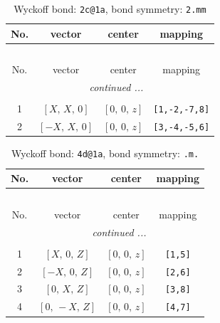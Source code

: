 \documentclass[fleqn,8pt]{jsarticle}
\begin{document}
\renewcommand{\arraystretch}{1.2}
\begin{longtable}{cccc}
\caption{Wyckoff bond: {\tt 2c@1a}, bond symmetry: {\tt 2.mm}}
 \\
 \hline \hline
No. & vector & center & mapping \\ \hline \endfirsthead

\multicolumn{3}{l}{\tablename\ \thetable{}} \\
 \hline \hline
No. & vector & center & mapping \\ \hline \endhead

 \hline \hline
\multicolumn{3}{r}{\footnotesize\it continued ...} \\ \endfoot

 \hline \hline
\multicolumn{3}{r}{} \\ \endlastfoot

1 & $\left[ X,\, X,\, 0 \right]$ & $\left[ 0,\, 0,\, z \right]$ & {\tt [1,-2,-7,8]} \\ \hline
2 & $\left[ - X,\, X,\, 0 \right]$ & $\left[ 0,\, 0,\, z \right]$ & {\tt [3,-4,-5,6]} \\
\end{longtable}
\renewcommand{\arraystretch}{1.2}
\begin{longtable}{cccc}
\caption{Wyckoff bond: {\tt 4d@1a}, bond symmetry: {\tt .m.}}
 \\
 \hline \hline
No. & vector & center & mapping \\ \hline \endfirsthead

\multicolumn{3}{l}{\tablename\ \thetable{}} \\
 \hline \hline
No. & vector & center & mapping \\ \hline \endhead

 \hline \hline
\multicolumn{3}{r}{\footnotesize\it continued ...} \\ \endfoot

 \hline \hline
\multicolumn{3}{r}{} \\ \endlastfoot

1 & $\left[ X,\, 0,\, Z \right]$ & $\left[ 0,\, 0,\, z \right]$ & {\tt [1,5]} \\ \hline
2 & $\left[ - X,\, 0,\, Z \right]$ & $\left[ 0,\, 0,\, z \right]$ & {\tt [2,6]} \\ \hline
3 & $\left[ 0,\, X,\, Z \right]$ & $\left[ 0,\, 0,\, z \right]$ & {\tt [3,8]} \\ \hline
4 & $\left[ 0,\, - X,\, Z \right]$ & $\left[ 0,\, 0,\, z \right]$ & {\tt [4,7]} \\
\end{longtable}
\end{document}

